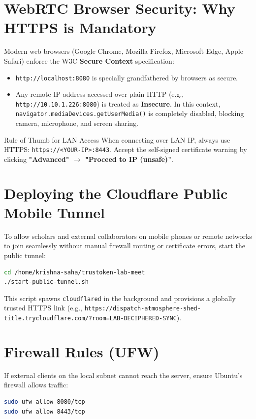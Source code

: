 \documentclass[11pt,a4paper]{report}
\begin{document}
\section{WebRTC Browser Security: Why HTTPS is Mandatory}
Modern web browsers (Google Chrome, Mozilla Firefox, Microsoft Edge, Apple Safari) enforce the W3C \textbf{Secure Context} specification:
\begin{itemize}
    \item \texttt{http://localhost:8080} is specially grandfathered by browsers as secure.
    \item Any remote IP address accessed over plain HTTP (e.g., \texttt{http://10.10.1.226:8080}) is treated as \textbf{Insecure}. In this context, \texttt{navigator.mediaDevices.getUserMedia()} is completely disabled, blocking camera, microphone, and screen sharing.
\end{itemize}

\begin{tipbox}{Rule of Thumb for LAN Access}
When connecting over LAN IP, always use HTTPS: \texttt{https://<YOUR-IP>:8443}.
Accept the self-signed certificate warning by clicking \textbf{"Advanced" $\rightarrow$ "Proceed to IP (unsafe)"}.
\end{tipbox}

\section{Deploying the Cloudflare Public Mobile Tunnel}
To allow scholars and external collaborators on mobile phones or remote networks to join seamlessly without manual firewall routing or certificate errors, start the public tunnel:
\begin{lstlisting}[language=bash]
cd /home/krishna-saha/trustoken-lab-meet
./start-public-tunnel.sh
\end{lstlisting}
This script spawns \texttt{cloudflared} in the background and provisions a globally trusted HTTPS link (e.g., \texttt{https://dispatch-atmosphere-shed-title.trycloudflare.com/?room=LAB-DECIPHERED-SYNC}).

\section{Firewall Rules (UFW)}
If external clients on the local subnet cannot reach the server, ensure Ubuntu's firewall allows traffic:
\begin{lstlisting}[language=bash]
sudo ufw allow 8080/tcp
sudo ufw allow 8443/tcp
\end{lstlisting}
\end{document}
